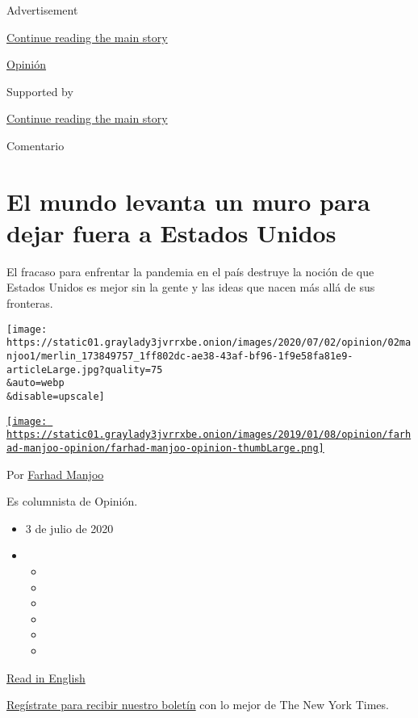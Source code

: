 Advertisement

\protect\hyperlink{after-top}{Continue reading the main story}

\href{/es/section/opinion}{Opinión}

Supported by

\protect\hyperlink{after-sponsor}{Continue reading the main story}

Comentario

\hypertarget{el-mundo-levanta-un-muro-para-dejar-fuera-a-estados-unidos}{%
\section{El mundo levanta un muro para dejar fuera a Estados
Unidos}\label{el-mundo-levanta-un-muro-para-dejar-fuera-a-estados-unidos}}

El fracaso para enfrentar la pandemia en el país destruye la noción de
que Estados Unidos es mejor sin la gente y las ideas que nacen más allá
de sus fronteras.

\texttt{[image: https://static01.graylady3jvrrxbe.onion/images/2020/07/02/opinion/02manjoo1/merlin\_173849757\_1ff802dc-ae38-43af-bf96-1f9e58fa81e9-articleLarge.jpg?quality=75\\\&auto=webp\\\&disable=upscale]}

\href{https://www.nytimes3xbfgragh.onion/by/farhad-manjoo}{\texttt{[image: https://static01.graylady3jvrrxbe.onion/images/2019/01/08/opinion/farhad-manjoo-opinion/farhad-manjoo-opinion-thumbLarge.png]}}

Por \href{https://www.nytimes3xbfgragh.onion/by/farhad-manjoo}{Farhad
Manjoo}

Es columnista de Opinión.

\begin{itemize}
\item
  3 de julio de 2020
\item
  \begin{itemize}
  \item
  \item
  \item
  \item
  \item
  \item
  \end{itemize}
\end{itemize}

\href{https://www.nytimes3xbfgragh.onion/2020/07/01/opinion/us-travel-ban-europe.html}{Read
in English}

\href{https://www.nytimes3xbfgragh.onion/newsletters/el-times}{Regístrate
para recibir nuestro boletín} con lo mejor de The New York Times.

